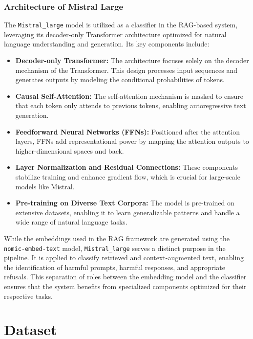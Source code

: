 \documentclass{article}
\begin{document}
\subsubsection{Architecture of Mistral Large}

The \texttt{Mistral\_large} model is utilized as a classifier in the RAG-based system, leveraging its decoder-only Transformer architecture optimized for natural language understanding and generation. Its key components include:

\begin{itemize}
    \item \textbf{Decoder-only Transformer:} 
    The architecture focuses solely on the decoder mechanism of the Transformer. This design processes input sequences and generates outputs by modeling the conditional probabilities of tokens.
    \item \textbf{Causal Self-Attention:} 
    The self-attention mechanism is masked to ensure that each token only attends to previous tokens, enabling autoregressive text generation.
    \item \textbf{Feedforward Neural Networks (FFNs):} 
    Positioned after the attention layers, FFNs add representational power by mapping the attention outputs to higher-dimensional spaces and back.
    \item \textbf{Layer Normalization and Residual Connections:} 
    These components stabilize training and enhance gradient flow, which is crucial for large-scale models like Mistral.
    \item \textbf{Pre-training on Diverse Text Corpora:} 
    The model is pre-trained on extensive datasets, enabling it to learn generalizable patterns and handle a wide range of natural language tasks.
\end{itemize}

While the embeddings used in the RAG framework are generated using the \texttt{nomic-embed-text} model, \texttt{Mistral\_large} serves a distinct purpose in the pipeline. It is applied to classify retrieved and context-augmented text, enabling the identification of harmful prompts, harmful responses, and appropriate refusals. This separation of roles between the embedding model and the classifier ensures that the system benefits from specialized components optimized for their respective tasks.


\section{Dataset}
\end{document}
